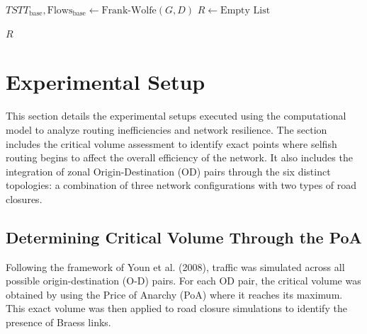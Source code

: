 \begin{algorithm}[H]
\caption{ Edge Removal and Paradox Identification}
\label{alg:edge_removal}

\BlankLine

$TSTT_{\text{base}}, \text{Flows}_{\text{base}} \gets \text{Frank-Wolfe}(G, D)$ 
$R \gets \text{Empty List}$\;

\BlankLine
{}

\Return $R$
\end{algorithm}

\section{Experimental Setup}
\label{sec:experimental_setup}
This section details the experimental setups executed using the computational model to analyze routing inefficiencies and network resilience. The section includes the critical volume assessment to identify exact points where selfish routing begins to affect the overall efficiency of the network. It also includes the integration of zonal Origin-Destination (OD) pairs through the six distinct topologies: a combination of three network configurations with two types of road closures. 

\subsection{Determining Critical Volume Through the PoA}
\label{sec:baseline_analysis}

Following the framework of Youn et al. (2008), traffic was simulated across all possible origin-destination (O-D) pairs. For each OD pair, the critical volume was obtained by using the Price of Anarchy (PoA) where it reaches its maximum. This exact volume was then applied to road closure simulations to identify the presence of Braess links. 

